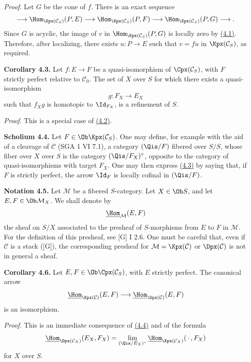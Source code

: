 \emph{Proof.} Let \(G\) be the cone of \(f\). There is an exact sequence
\[
  \longrightarrow \Hom_{\Kpx(\mathcal C_S)}(P,E)
  \longrightarrow \Hom_{\Kpx(\mathcal C_S)}(P,F)
  \longrightarrow \Hom_{\Kpx(\mathcal C_S)}(P,G)
  \longrightarrow .
\]
Since \(G\) is acyclic, the image of \(v\) in \(\Hom_{\Kpx(\mathcal C_S)}(P,G)\) is locally zero by \hyperlink{sga6.e01.lem.4-1}{(4.1)}. Therefore, after localizing, there exists \(u:P\to E\) such that \(v=fu\) in \(\Kpx(\mathcal C_S)\), as required.

\textbf{Corollary 4.3.} Let \(f:E\to F\) be a quasi-isomorphism of \(\Cpx(\mathcal C_S)\), with \(F\) strictly perfect relative to \(\mathcal C_0\). The set of \(X\) over \(S\) for which there exists a quasi-isomorphism
\[
  g:F_X\longrightarrow E_X
\]
such that \(f_Xg\) is homotopic to \(\Id_{F_X}\), is a refinement of \(S\).

\emph{Proof.} This is a special case of \hyperlink{sga6.e01.cor.4-2}{(4.2)}.

\textbf{Scholium 4.4.} Let \(F\in\Ob\Kpx(\mathcal C_S)\). One may define, for example with the aid of a cleavage of \(\mathcal C\) (SGA 1 VI 7.1), a category \((\Qis/F)\) fibered over \(S/S\), whose fiber over \(X\) over \(S\) is the category \((\Qis/F_X)^\circ\), opposite to the category of quasi-isomorphisms with target \(F_X\). One may then express \hyperlink{sga6.e01.cor.4-3}{(4.3)} by saying that, if \(F\) is strictly perfect, the arrow \(\Id_F\) is locally cofinal in \((\Qis/F)\).

\textbf{Notation 4.5.} Let \(\mathcal M\) be a fibered \(S\)-category. Let \(X\in\Ob S\), and let \(E,F\in\Ob\mathcal M_X\). We shall denote by
\[
  \underline{\Hom}_{\mathcal M}(E,F)
\]
the sheaf on \(S/X\) associated to the presheaf of \(S\)-morphisms from \(E\) to \(F\) in \(\mathcal M\). For the definition of this presheaf, see [G] I 2.6. One must be careful that, even if \(\mathcal C\) is a stack ([G]), the corresponding presheaf for \(\mathcal M=\Kpx(\mathcal C)\) or \(\Dpx(\mathcal C)\) is not in general a sheaf.

\textbf{Corollary 4.6.} Let \(E,F\in\Ob\Cpx(\mathcal C_S)\), with \(E\) strictly perfect. The canonical arrow
\[
  \underline{\Hom}_{\Kpx(\mathcal C)}(E,F)
  \longrightarrow
  \underline{\Hom}_{\Dpx(\mathcal C)}(E,F)
\]
is an isomorphism.

\emph{Proof.} This is an immediate consequence of \hyperlink{sga6.e01.schol.4-4}{(4.4)} and of the formula
\[
  \underline{\Hom}_{\Dpx(\mathcal C_X)}(E_X,F_X)
  = \lim_{(\Qis/E_X)^\circ}\underline{\Hom}_{\Kpx(\mathcal C_X)}(\,\cdot\,,F_X)
\]
for \(X\) over \(S\).

